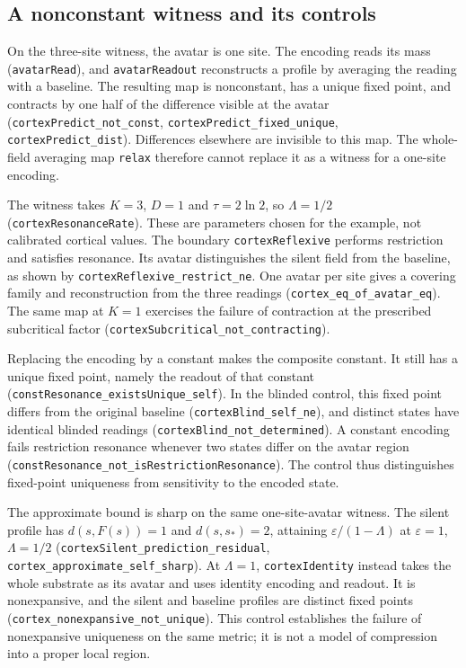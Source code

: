 \documentclass{article}
\begin{document}
\subsection{A nonconstant witness and its controls}

On the three-site witness, the avatar is one site. The encoding reads its mass (\texttt{avatarRead}), and \texttt{avatarReadout} reconstructs a profile by averaging the reading with a baseline. The resulting map is nonconstant, has a unique fixed point, and contracts by one half of the difference visible at the avatar (\nolinkurl{cortexPredict_not_const}, \nolinkurl{cortexPredict_fixed_unique}, \nolinkurl{cortexPredict_dist}). Differences elsewhere are invisible to this map. The whole-field averaging map \texttt{relax} therefore cannot replace it as a witness for a one-site encoding.

The witness takes $K=3$, $D=1$ and $\tau=2\ln2$, so $\Lambda=1/2$ (\texttt{cortexResonanceRate}). These are parameters chosen for the example, not calibrated cortical values. The boundary \texttt{cortexReflexive} performs restriction and satisfies resonance. Its avatar distinguishes the silent field from the baseline, as shown by \nolinkurl{cortexReflexive_restrict_ne}. One avatar per site gives a covering family and reconstruction from the three readings (\nolinkurl{cortex_eq_of_avatar_eq}). The same map at $K=1$ exercises the failure of contraction at the prescribed subcritical factor (\nolinkurl{cortexSubcritical_not_contracting}).

Replacing the encoding by a constant makes the composite constant. It still has a unique fixed point, namely the readout of that constant (\nolinkurl{constResonance_existsUnique_self}). In the blinded control, this fixed point differs from the original baseline (\nolinkurl{cortexBlind_self_ne}), and distinct states have identical blinded readings (\nolinkurl{cortexBlind_not_determined}). A constant encoding fails restriction resonance whenever two states differ on the avatar region (\nolinkurl{constResonance_not_isRestrictionResonance}). The control thus distinguishes fixed-point uniqueness from sensitivity to the encoded state.

The approximate bound is sharp on the same one-site-avatar witness. The silent profile has $d(s,F(s))=1$ and $d(s,s_*)=2$, attaining $\varepsilon/(1-\Lambda)$ at $\varepsilon=1$, $\Lambda=1/2$
(\nolinkurl{cortexSilent_prediction_residual},
\nolinkurl{cortex_approximate_self_sharp}).
At $\Lambda=1$, \texttt{cortexIdentity} instead takes the whole substrate as its avatar and uses identity encoding and readout. It is nonexpansive, and the silent and baseline profiles are distinct fixed points
(\nolinkurl{cortex_nonexpansive_not_unique}).
This control establishes the failure of nonexpansive uniqueness on the same metric; it is not a model of compression into a proper local region.
\end{document}
